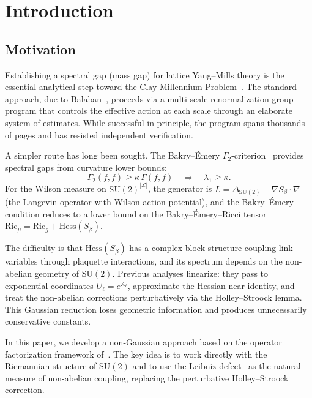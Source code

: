 \documentclass[11pt,a4paper]{article}
\theoremstyle{plain}
\theoremstyle{definition}
\theoremstyle{remark}
\newcommand{\SU}{\mathrm{SU}}
\newcommand{\Ric}{\mathrm{Ric}}
\newcommand{\Hess}{\mathrm{Hess}}
\newcommand{\cL}{\mathcal{L}}
\begin{document}
\section{Introduction}\label{sec:intro}

\subsection{Motivation}

Establishing a spectral gap (mass gap) for lattice Yang--Mills theory
is the essential analytical step toward the Clay Millennium
Problem~\cite{JaffeWitten}. The standard approach, due to
Balaban~\cite{Balaban1983,Balaban1984,Balaban1985}, proceeds via a
multi-scale renormalization group program that controls the effective
action at each scale through an elaborate system of estimates. While
successful in principle, the program spans thousands of pages and has
resisted independent verification.

A simpler route has long been sought. The Bakry--\'Emery
$\Gamma_2$-criterion~\cite{BakryEmery1985,BakryGentilLedoux2014}
provides spectral gaps from curvature lower bounds:
\begin{equation}\label{eq:BE-implication}
\Gamma_2(f,f) \geq \kappa\,\Gamma(f,f)
\quad\Longrightarrow\quad
\lambda_1 \geq \kappa.
\end{equation}
For the Wilson measure on $\SU(2)^{|\cL|}$, the generator is
$L = \Delta_{\SU(2)} - \nabla S_\beta \cdot \nabla$ (the Langevin operator
with Wilson action potential), and the Bakry--\'Emery condition
reduces to a lower bound on the Bakry--\'Emery--Ricci tensor
$\Ric_\mu = \Ric_g + \Hess(S_\beta)$.

The difficulty is that $\Hess(S_\beta)$ has a complex block structure
coupling link variables through plaquette interactions, and its
spectrum depends on the non-abelian geometry of $\SU(2)$. Previous
analyses linearize: they pass to exponential coordinates $U_\ell = e^{A_\ell}$,
approximate the Hessian near identity, and treat the non-abelian
corrections perturbatively via the Holley--Stroock lemma. This
Gaussian reduction loses geometric information and produces unnecessarily
conservative constants.

In this paper, we develop a non-Gaussian approach based on the
operator factorization framework of~\cite{Fontes2026a,Fontes2026d}.
The key idea is to work directly with the Riemannian structure of
$\SU(2)$ and to use the Leibniz defect~\cite{Fontes2026d} as the
natural measure of non-abelian coupling, replacing the perturbative
Holley--Stroock correction.
\end{document}
